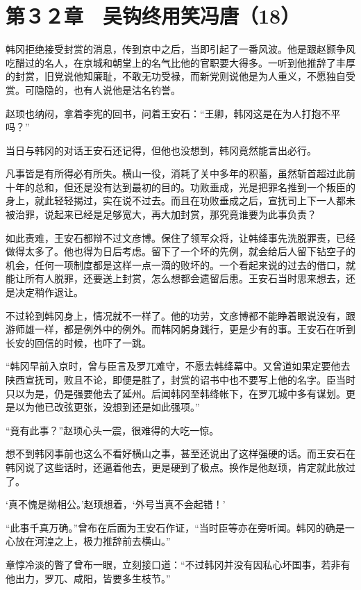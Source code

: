 \section{第３２章　吴钩终用笑冯唐（18）}

韩冈拒绝接受封赏的消息，传到京中之后，当即引起了一番风波。他是跟赵颢争风吃醋过的名人，在京城和朝堂上的名气比他的官职要大得多。一听到他推辞了丰厚的封赏，旧党说他知廉耻，不敢无功受禄，而新党则说他是为人重义，不愿独自受赏。可隐隐的，也有人说他是沽名钓誉。

赵顼也纳闷，拿着李宪的回书，问着王安石：“王卿，韩冈这是在为人打抱不平吗？”

当日与韩冈的对话王安石还记得，但他也没想到，韩冈竟然能言出必行。

凡事皆是有所得必有所失。横山一役，消耗了关中多年的积蓄，虽然斩首超过此前十年的总和，但还是没有达到最初的目的。功败垂成，光是把罪名推到一个叛臣的身上，就此轻轻揭过，实在说不过去。而且在功败垂成之后，宣抚司上下一人都未被治罪，说起来已经是足够宽大，再大加封赏，那究竟谁要为此事负责？

如此责难，王安石都辩不过文彦博。保住了领军众将，让韩绛事先洗脱罪责，已经做得太多了。他也得为日后考虑。留下了一个坏的先例，就会给后人留下钻空子的机会，任何一项制度都是这样一点一滴的败坏的。一个看起来说的过去的借口，就能让所有人脱罪，还要送上封赏，怎么想都会遗留后患。王安石当时思来想去，还是决定稍作退让。

不过轮到韩冈身上，情况就不一样了。他的功劳，文彦博都不能睁着眼说没有，跟游师雄一样，都是例外中的例外。而韩冈躬身践行，更是少有的事。王安石在听到长安的回信的时候，也吓了一跳。

“韩冈早前入京时，曾与臣言及罗兀难守，不愿去韩绛幕中。又曾道如果定要他去陕西宣抚司，败且不论，即便是胜了，封赏的诏书中也不要写上他的名字。臣当时只以为是，仍是强要他去了延州。后闻韩冈至韩绛帐下，在罗兀城中多有谋划。更是以为他已改弦更张，没想到还是如此强项。”

“竟有此事？”赵顼心头一震，很难得的大吃一惊。

想不到韩冈事前也这么不看好横山之事，甚至还说出了这样强硬的话。而王安石在韩冈说了这些话时，还逼着他去，更是硬到了极点。换作是他赵顼，肯定就此放过了。

‘真不愧是拗相公。’赵顼想着，‘外号当真不会起错！’

“此事千真万确。”曾布在后面为王安石作证，“当时臣等亦在旁听闻。韩冈的确是一心放在河湟之上，极力推辞前去横山。”

章惇冷淡的瞥了曾布一眼，立刻接口道：“不过韩冈并没有因私心坏国事，若非有他出力，罗兀、咸阳，皆要多生枝节。”

